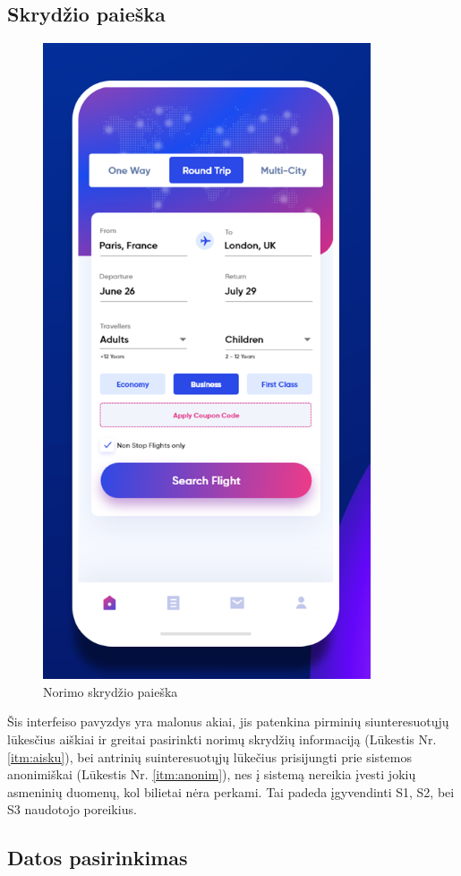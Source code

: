 \documentclass{VUMIFPSkursinis}
\begin{document}
\subsection{Skrydžio paieška}
\begin{figure}[H]
    \centering
    \includegraphics[scale=0.8]{img/info.png}
    \caption{Norimo skrydžio paieška}
    \label{img:info1}
\end{figure}
Šis interfeiso pavyzdys yra malonus akiai, jis patenkina pirminių siunteresuotųjų lūkesčius aiškiai ir greitai pasirinkti norimų skrydžių informaciją (Lūkestis Nr. \ref{itm:aisku}), bei antrinių suinteresuotųjų lūkečius prisijungti prie sistemos anonimiškai (Lūkestis Nr. \ref{itm:anonim}), nes į sistemą nereikia įvesti jokių asmeninių duomenų, kol bilietai nėra perkami. Tai padeda įgyvendinti S1, S2, bei S3 naudotojo poreikius.

\subsection{Datos pasirinkimas}
\end{document}
